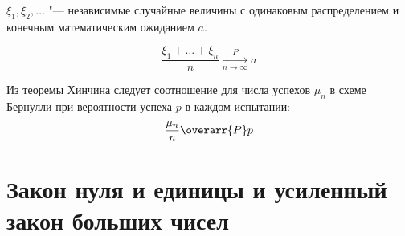 \begin{theorem}[Хинчина]
    $ \xi_1, \xi_2, \dotsc $ "--- независимые случайные величины с одинаковым распределением
    и конечным математическим ожиданием $ a $.

    $$ \frac{\xi_1 + \dots + \xi_n}n \xrightarrow[n \to \infty]{P} a $$
\end{theorem}

\begin{remark}
    Из теоремы Хинчина следует соотношение для числа успехов $ \mu_n $ в схеме Бернулли при
    вероятности успеха $ p $ в каждом испытании:
    $$ \frac{\mu_n}n \overarr{P} p $$
\end{remark}

\section{Закон нуля и единицы и усиленный закон больших чисел}
